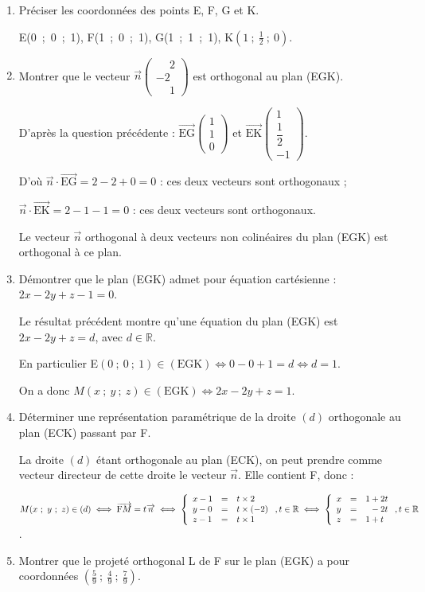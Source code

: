 \documentclass[10pt]{article}
\providecommand{\R}{\mathbb{R}}
\providecommand{\vect}[1]{\overrightarrow{#1}}
\begin{document}
\begin{enumerate}
\item Préciser les coordonnées des points E, F{}, G et K.

E(0~;~0~;~1), \quad F(1~;~0~;~1), \quad G(1~;~1~;~1), \quad K$\left(1~;~\frac12~;~0\right)$.
\item Montrer que le vecteur $\vect{n}\begin{pmatrix}\phantom{-}2\\-2\\\phantom{-}1\end{pmatrix}$ est orthogonal au plan (EGK).

D'après la question précédente : $\vect{\text{EG}}\begin{pmatrix}1\\1\\0 \end{pmatrix}$ et $\vect{\text{EK}}\begin{pmatrix}1\\\dfrac12\\- 1 \end{pmatrix}$.

D'où $\vect{n} \cdot \vect{\text{EG}} = 2 - 2 + 0 = 0$ : ces deux vecteurs sont orthogonaux ;

$\vect{n} \cdot \vect{\text{EK}} = 2 - 1 - 1 = 0$ : ces deux vecteurs sont orthogonaux.

Le vecteur $\vect{n}$ orthogonal à deux vecteurs non colinéaires du plan (EGK) est orthogonal à ce plan.
\item Démontrer que le plan (EGK) admet pour équation cartésienne : $2x - 2y + z - 1 = 0.$

Le résultat précédent montre qu'une équation du plan (EGK) est $2x - 2y + z = d$, avec $d \in \R$.

En particulier E$(0~;~0~;~1) \in (\text{EGK}) \iff 0 - 0 + 1 = d \iff d = 1$.

On a donc $M(x~;~y~;~z) \in (\text{EGK}) \iff 2x - 2y + z = 1$.
\item Déterminer une représentation paramétrique de la droite $(d)$ orthogonale au plan (ECK)
passant par F{}.

La droite $(d)$ étant orthogonale au plan (ECK), on peut prendre comme vecteur directeur de cette droite le vecteur $\vect{n}$. Elle contient F, donc :

$M(x~;~y~;~z) \in (d) \iff \vect{\text{F}M} = t\vect{n} \iff \left\{\begin{array}{l c l}
x - 1&=&t \times 2\\
y - 0&=&t \times (- 2)\\
z - 1&=&t \times 1
\end{array}\right., t \in \R \iff 
\left\{\begin{array}{l c l}
x &=& 1 + 2t\\
y &=&\phantom{1}- 2t\\
z &=&1 + t
\end{array}\right., t \in \R$.
\item Montrer que le projeté orthogonal L de F sur le plan (EGK) a pour coordonnées $\left(\frac59~;~\frac49~;~\frac79\right)$.


\end{enumerate}
\end{document}
